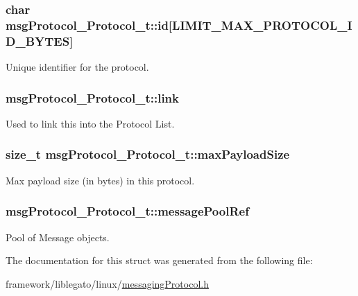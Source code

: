 \subsubsection[{\texorpdfstring{id}{id}}]{\setlength{\rightskip}{0pt plus 5cm}char msg\+Protocol\+\_\+\+Protocol\+\_\+t\+::id\mbox{[}{\bf L\+I\+M\+I\+T\+\_\+\+M\+A\+X\+\_\+\+P\+R\+O\+T\+O\+C\+O\+L\+\_\+\+I\+D\+\_\+\+B\+Y\+T\+ES}\mbox{]}}\hypertarget{structmsg_protocol___protocol__t_ab704e938d2a578754db17ce96fc1cd67}{}\label{structmsg_protocol___protocol__t_ab704e938d2a578754db17ce96fc1cd67}


Unique identifier for the protocol. 

\subsubsection[{\texorpdfstring{link}{link}}]{ msg\+Protocol\+\_\+\+Protocol\+\_\+t\+::link}\hypertarget{structmsg_protocol___protocol__t_a4060449fd5f4871ae1c94946e2de4768}{}\label{structmsg_protocol___protocol__t_a4060449fd5f4871ae1c94946e2de4768}


Used to link this into the Protocol List. 

\subsubsection[{\texorpdfstring{max\+Payload\+Size}{maxPayloadSize}}]{\setlength{\rightskip}{0pt plus 5cm}size\+\_\+t msg\+Protocol\+\_\+\+Protocol\+\_\+t\+::max\+Payload\+Size}\hypertarget{structmsg_protocol___protocol__t_ad3dbf309dd7ad22ad1bd909c30da197a}{}\label{structmsg_protocol___protocol__t_ad3dbf309dd7ad22ad1bd909c30da197a}


Max payload size (in bytes) in this protocol. 

\subsubsection[{\texorpdfstring{message\+Pool\+Ref}{messagePoolRef}}]{ msg\+Protocol\+\_\+\+Protocol\+\_\+t\+::message\+Pool\+Ref}\hypertarget{structmsg_protocol___protocol__t_a94ada262e44b7aad2f0bbed25db09fa3}{}\label{structmsg_protocol___protocol__t_a94ada262e44b7aad2f0bbed25db09fa3}


Pool of Message objects. 



The documentation for this struct was generated from the following file\+:\begin{DoxyCompactItemize}
\item 
framework/liblegato/linux/\hyperlink{messaging_protocol_8h}{messaging\+Protocol.\+h}\end{DoxyCompactItemize}

